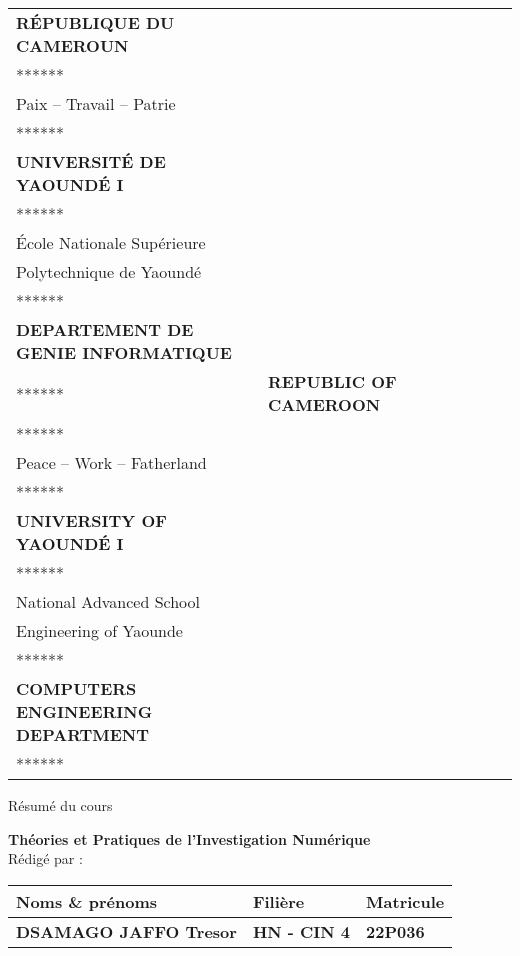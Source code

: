 \documentclass[12pt, a4paper]{article}
\begin{document}
\begin{titlepage}
	\begin{tabular}{p{0.5\linewidth} p{0.5\linewidth}}
\centering
\textbf{RÉPUBLIQUE DU CAMEROUN}\\
******\\
Paix -- Travail -- Patrie\\
******\\
\textbf{UNIVERSITÉ DE YAOUNDÉ I}\\
******\\
École Nationale Supérieure\\
Polytechnique de Yaoundé\\
******\\
\textbf{DEPARTEMENT DE GENIE INFORMATIQUE}\\
****** &
\centering
\textbf{REPUBLIC OF CAMEROON}\\
******\\
Peace -- Work -- Fatherland\\
******\\
\textbf{UNIVERSITY OF YAOUNDÉ I}\\
******\\
National Advanced School\\
Engineering of Yaounde\\
******\\
\textbf {COMPUTERS ENGINEERING DEPARTMENT}\\
****** \\
\end{tabular}
    \centering
    \vspace*{1cm}
    
    {\Large Résumé du cours}
    
    {\LARGE \textbf{Théories et Pratiques de l'Investigation Numérique\\}} 
    \vspace{1cm}
    {\large Rédigé par :}
    \vspace{1cm}
    \renewcommand{\arraystretch}{2}
	\begin{tabular}{|>{\centering\arraybackslash}p{8cm}|>{\centering\arraybackslash}p{4cm}|>{\centering\arraybackslash}p{3cm}|}
        \hline
        \textbf{Noms \& prénoms} & \textbf{Filière} & \textbf{Matricule} \\
        \hline
        \large\textbf {DSAMAGO JAFFO Tresor} & \large\textbf{HN - CIN 4} & \large\textbf{22P036} \\
        \hline
    \end{tabular}
    \vspace{10\baselineskip}
    

\end{titlepage}
\end{document}
